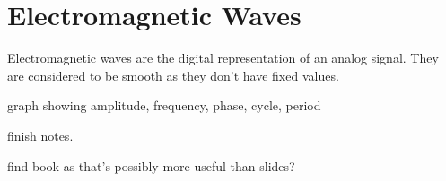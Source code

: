 \section{Electromagnetic Waves}
Electromagnetic waves are the digital representation of an analog signal. They are considered to be smooth as they don't have fixed values. 


\begin{todo}
graph showing amplitude, frequency, phase, cycle, period
\end{todo}

\begin{todo}
    finish notes.

    find book as that's possibly more useful than slides?
\end{todo}